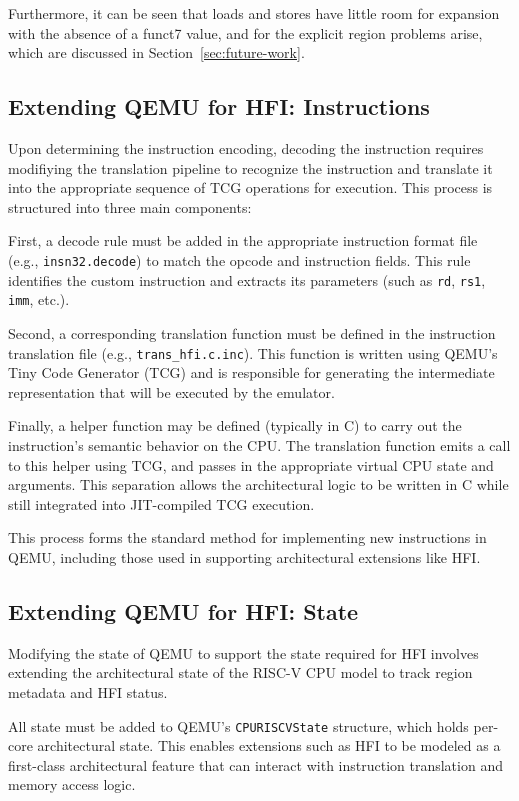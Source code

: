 \documentclass[conference,compsoc]{IEEEtran}
\begin{document}
Furthermore, it can be seen that loads and stores have little room for expansion with the absence of a funct7 value, and for the explicit region problems arise, which are discussed in Section~\ref{sec:future-work}. 

\subsection{Extending QEMU for HFI: Instructions}
Upon determining the instruction encoding, decoding the instruction requires modifiying the translation pipeline to recognize the instruction and translate it into the appropriate sequence of TCG operations for execution. This process is structured into three main components:

First, a decode rule must be added in the appropriate instruction format file (e.g., \texttt{insn32.decode}) to match the opcode and instruction fields. This rule identifies the custom instruction and extracts its parameters (such as \texttt{rd}, \texttt{rs1}, \texttt{imm}, etc.).

Second, a corresponding translation function must be defined in the instruction translation file (e.g., \texttt{trans\_hfi.c.inc}). This function is written using QEMU's Tiny Code Generator (TCG) and is responsible for generating the intermediate representation that will be executed by the emulator.

Finally, a helper function may be defined (typically in C) to carry out the instruction's semantic behavior on the CPU. The translation function emits a call to this helper using TCG, and passes in the appropriate virtual CPU state and arguments. This separation allows the architectural logic to be written in C while still integrated into JIT-compiled TCG execution.

This process forms the standard method for implementing new instructions in QEMU, including those used in supporting architectural extensions like HFI.

\subsection{Extending QEMU for HFI: State}
Modifying the state of QEMU to support the state required for HFI involves extending the architectural state of the RISC-V CPU model to track region metadata and HFI status.

All state must be added to QEMU's \texttt{CPURISCVState} structure, which holds per-core architectural state. This enables extensions such as HFI to be modeled as a first-class architectural feature that can interact with instruction translation and memory access logic.
\end{document}
